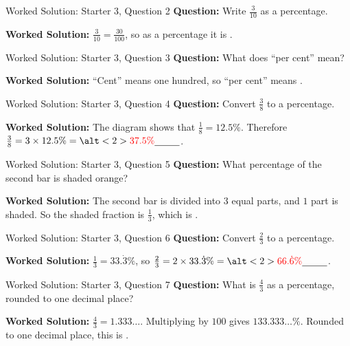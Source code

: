 \documentclass{beamer}
\newcommand{\ablank}[1]{%
  \alt<2>{\textcolor{red}{#1}}{\underline{\phantom{#1}}}%
}
\begin{document}
\begin{frame}[t]{Worked Solution: Starter 3, Question 2}
\textbf{Question:} Write \(\frac{3}{10}\) as a percentage.

\smallskip
\textbf{Worked Solution:} \(\frac{3}{10} = \frac{30}{100}\), so as a percentage it is \ablank{$30\%$}.
\end{frame}

\begin{frame}[t]{Worked Solution: Starter 3, Question 3}
\textbf{Question:} What does ``per cent'' mean?

\smallskip
\textbf{Worked Solution:} ``Cent'' means one hundred, so ``per cent'' means \ablank{out of 100}.
\end{frame}

\begin{frame}[t]{Worked Solution: Starter 3, Question 4}
\textbf{Question:} Convert \(\frac{3}{8}\) to a percentage.

\smallskip
\textbf{Worked Solution:} The diagram shows that \(\frac{1}{8} = 12.5\%\). Therefore \(\frac{3}{8} = 3 \times 12.5\% = \ablank{37.5\%}\).
\end{frame}

\begin{frame}[t]{Worked Solution: Starter 3, Question 5}
\textbf{Question:} What percentage of the second bar is shaded orange?

\smallskip
\textbf{Worked Solution:} The second bar is divided into \(3\) equal parts, and \(1\) part is shaded. So the shaded fraction is \(\frac{1}{3}\), which is \ablank{$33.\dot{3}\%$}.
\end{frame}

\begin{frame}[t]{Worked Solution: Starter 3, Question 6}
\textbf{Question:} Convert \(\frac{2}{3}\) to a percentage.

\smallskip
\textbf{Worked Solution:} \(\frac{1}{3} = 33.\dot{3}\%\), so \(\frac{2}{3} = 2 \times 33.\dot{3}\% = \ablank{66.\dot{6}\%}\).
\end{frame}

\begin{frame}[t]{Worked Solution: Starter 3, Question 7}
\textbf{Question:} What is \(\frac{4}{3}\) as a percentage, rounded to one decimal place?

\smallskip
\textbf{Worked Solution:} \(\frac{4}{3} = 1.333\ldots\). Multiplying by \(100\) gives \(133.333\ldots\%\). Rounded to one decimal place, this is \ablank{$133.3\%$}.
\end{frame}
\end{document}
